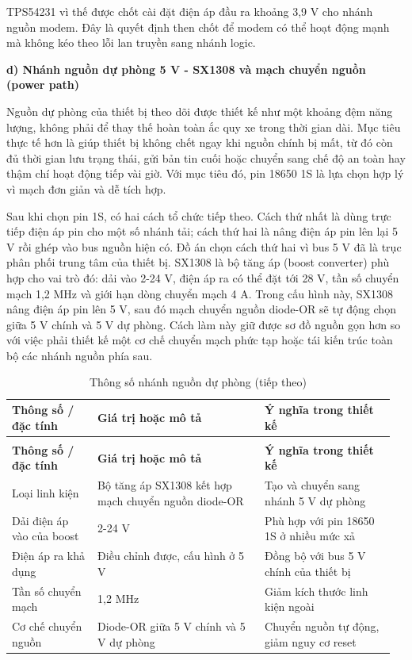 \documentclass[a4paper]{extarticle}
\newcommand{\thesissettableid}[2]{%
  \renewcommand{\thetable}{#1}%
  \renewcommand{\theHtable}{#2}%
}
\begin{document}
TPS54231 vì thế được chốt cài đặt điện áp đầu ra khoảng 3,9 V cho nhánh nguồn modem. Đây là quyết định then chốt để
modem có thể hoạt động mạnh mà không kéo theo lỗi lan truyền sang nhánh logic.

\textbf{d) Nhánh nguồn dự phòng 5 V - SX1308 và mạch chuyển nguồn (power path)}

Nguồn dự phòng của thiết bị theo dõi được thiết kế như một khoảng đệm năng lượng,
không phải để thay thế hoàn toàn ắc quy xe trong thời gian dài. Mục tiêu
thực tế hơn là giúp thiết bị không chết ngay khi nguồn chính bị mất, từ đó
còn đủ thời gian lưu
trạng thái, gửi bản tin cuối hoặc chuyển sang chế độ an toàn hay thậm chí hoạt động tiếp vài giờ. Với mục tiêu
đó, pin 18650 1S là lựa chọn hợp lý vì mạch đơn giản và dễ tích hợp.

Sau khi chọn pin 1S, có hai cách tổ chức tiếp theo. Cách thứ nhất là dùng
trực tiếp điện áp pin cho một số nhánh tải; cách thứ hai là nâng điện áp pin
lên lại 5 V rồi ghép vào bus nguồn hiện có. Đồ án chọn cách thứ hai vì bus
5 V đã là trục phân phối trung tâm của thiết bị. SX1308 là bộ tăng áp
(boost converter) phù hợp cho vai trò đó: dải vào 2-24 V, điện áp ra có thể
đặt tới 28 V, tần số chuyển mạch 1,2 MHz và giới hạn dòng chuyển mạch 4 A.
Trong cấu hình này, SX1308 nâng điện áp pin lên 5 V, sau đó mạch chuyển nguồn
diode-OR sẽ tự động chọn giữa 5 V chính và 5 V dự phòng. Cách làm này giữ
được sơ đồ nguồn gọn hơn so với việc phải thiết kế một cơ chế chuyển mạch
phức tạp hoặc tái kiến trúc toàn bộ các nhánh nguồn phía sau.

{\thesissettableid{3.12D}{condensed-bang-3-12d-thong-so-nhanh-nguon-du-phong}
\def\LTcaptype{table}
\begin{longtable}{|L{0.215\linewidth}|L{0.417\linewidth}|L{0.326\linewidth}|}
\caption{Thông số nhánh nguồn dự phòng}\label{tab:condensed-bang-3-12d-thong-so-nhanh-nguon-du-phong}\\
\hline
\textbf{Thông số / đặc tính} & \textbf{Giá trị hoặc mô tả} & \textbf{Ý nghĩa trong thiết kế} \\
\hline
\endfirsthead
\caption[]{Thông số nhánh nguồn dự phòng (tiếp theo)}\\
\hline
\textbf{Thông số / đặc tính} & \textbf{Giá trị hoặc mô tả} & \textbf{Ý nghĩa trong thiết kế} \\
\hline
\endhead
\endfoot
\endlastfoot
Loại linh kiện & Bộ tăng áp SX1308 kết hợp mạch chuyển nguồn diode-OR & Tạo và chuyển sang nhánh 5 V dự phòng \\\hline
Dải điện áp vào của boost & 2-24 V & Phù hợp với pin 18650 1S ở nhiều mức xả \\\hline
Điện áp ra khả dụng & Điều chỉnh được, cấu hình ở 5 V & Đồng bộ với bus 5 V chính của thiết bị \\\hline
Tần số chuyển mạch & 1,2 MHz & Giảm kích thước linh kiện ngoài \\\hline
Cơ chế chuyển nguồn & Diode-OR giữa 5 V chính và 5 V dự phòng & Chuyển nguồn tự động, giảm nguy cơ reset \\\hline
\end{longtable}
}
\end{document}
